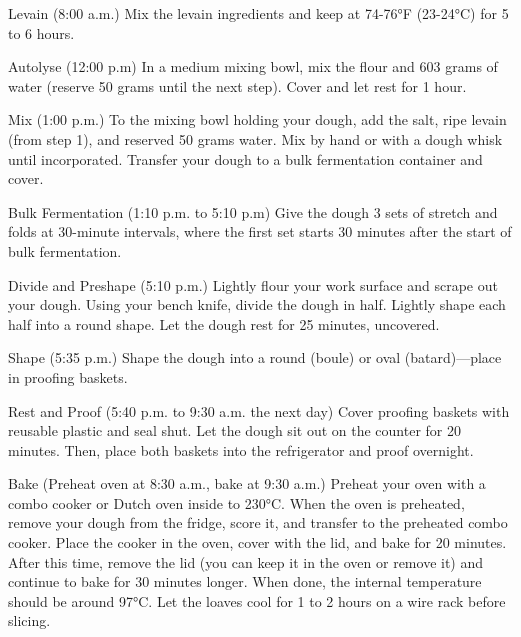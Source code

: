 \begin{method}

Levain (8:00 a.m.) Mix the levain ingredients and keep at 74-76°F (23-24°C) for 5 to 6 hours.

Autolyse (12:00 p.m) In a medium mixing bowl, mix the flour and 603 grams of water (reserve 50 grams until
the next step). Cover and let rest for 1 hour.

Mix (1:00 p.m.) To the mixing bowl holding your dough, add the salt, ripe levain (from step 1), and reserved 50
grams water. Mix by hand or with a dough whisk until incorporated. Transfer your dough to a bulk fermentation
container and cover.

Bulk Fermentation (1:10 p.m. to 5:10 p.m) Give the dough 3 sets of stretch and folds at 30-minute intervals,
where the first set starts 30 minutes after the start of bulk fermentation.

Divide and Preshape (5:10 p.m.) Lightly flour your work surface and scrape out your dough. Using your bench
knife, divide the dough in half. Lightly shape each half into a round shape. Let the dough rest for 25 minutes,
uncovered.

Shape (5:35 p.m.) Shape the dough into a round (boule) or oval (batard)—place in proofing baskets.

Rest and Proof (5:40 p.m. to 9:30 a.m. the next day) Cover proofing baskets with reusable plastic and seal
shut. Let the dough sit out on the counter for 20 minutes. Then, place both baskets into the refrigerator and proof
overnight.

Bake (Preheat oven at 8:30 a.m., bake at 9:30 a.m.) Preheat your oven with a combo cooker or Dutch oven
inside to 230°C. When the oven is preheated, remove your dough from the fridge, score it, and transfer
to the preheated combo cooker. Place the cooker in the oven, cover with the lid, and bake for 20 minutes. After
this time, remove the lid (you can keep it in the oven or remove it) and continue to bake for 30 minutes longer.
When done, the internal temperature should be around 97°C. Let the loaves cool for 1 to 2 hours on a
wire rack before slicing.
\end{method}





    
